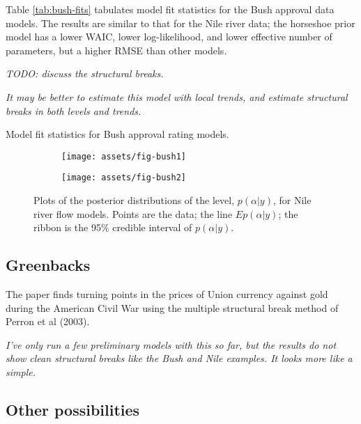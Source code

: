 \documentclass{article}
\begin{document}
Table \ref{tab:bush-fits} tabulates model fit statistics for the Bush approval data models. 
The results are similar to that for the Nile river data; the horseshoe prior model has a lower WAIC, lower log-likelihood, and lower effective number of parameters, but a higher RMSE than other models.

\textit{TODO: discuss the structural breaks.}

\textit{It may be better to estimate this model with local trends, and estimate structural breaks in both levels and trends.}

\begin{table}[htpb]
  \centering
  
  \caption{Model fit statistics for Bush approval rating models.}
  \label{tab:bush-fits}
\end{table}

\begin{figure}[htpb]
  \centering
  \begin{subfigure}{1.0\textwidth}
    \texttt{[image: assets/fig-bush1]}
    \caption{}
    \label{fig:bush1}
  \end{subfigure}
  \begin{subfigure}{1.0\textwidth}
    \texttt{[image: assets/fig-bush2]}
    \caption{}
    \label{fig:bush2}
  \end{subfigure}
  \caption{Plots of the posterior distributions of the level, $p(\alpha | y)$, for Nile river flow models. Points are the data; the line $E p(\alpha | y)$; the ribbon is the 95\% credible interval of $p(\alpha | y)$.}
  \label{fig:bush-posterior}
\end{figure}


\subsection{Greenbacks}
\label{sec:greenbacks}

The paper \textcite{WillardGuinnaneEtAl1996} finds turning points in the prices of Union currency against gold during the American Civil War using the multiple structural break method of Perron et al (2003).

\textit{I've only run a few preliminary models with this so far, but the results do not show clean structural breaks like the Bush and Nile examples. It looks more like a simple.}

\subsection{Other possibilities}
\end{document}
